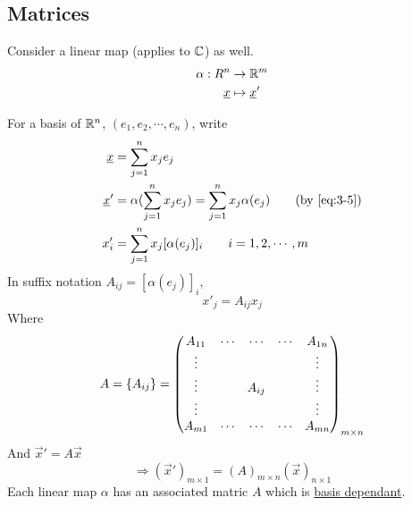 \documentclass{article}
\numberwithin{equation}{section}
\begin{document}
\subsection{Matrices}
Consider a linear map (applies to $\mathbb{C}$) as well.
\begin{align*}
    \alpha: R^n &\rightarrow \mathbb{R}^m \\
    \underline{x} &\mapsto \underline{x}'
\end{align*}

For a basis of $\mathbb{R}^n$, $(e_1, e_2, \cdots, e_n)$, write
\begin{align*}
    \vec x &= \sum_{j=1}^{n}{x_je_j} \\
    \vec x' &= \alpha(\sum_{j=1}^{n}{x_je_j}) = \sum_{j=1}^{n}{x_j\alpha(e_j)} \tag{by \ref{eq:3-5}}\\
    x'_i &= \sum_{j=1}^{n}{x_j [\alpha(e_j)]_i} \qquad i = 1, 2, \cdots, m
\end{align*}
In suffix notation $A_{ij} = [\alpha(e_j)]_i$, 
\begin{equation}\label{eq:3-10}
    x'_j = A_{ij}x_j
\end{equation}
Where
\[
    A = \left\{ A_{ij} \right\} = \begin{pmatrix}
        A_{11} & \cdots & \cdots & \cdots & A_{1n} \\
        \vdots &        &        &        & \vdots \\
        \vdots &        & A_{ij} &        & \vdots \\
        \vdots &        &        &        & \vdots \\
        A_{m1} & \cdots & \cdots & \cdots & A_{mn} \\
    \end{pmatrix}_{m \times n}
\]
And $\vec x' = A \vec x$
\[
    \Rightarrow (\vec x')_{m \times 1} = (A)_{m \times n}(\vec x)_{n \times 1}    
\]
Each linear map $\alpha$ has an associated matric $A$ which is \underline{basis dependant}.
\end{document}
